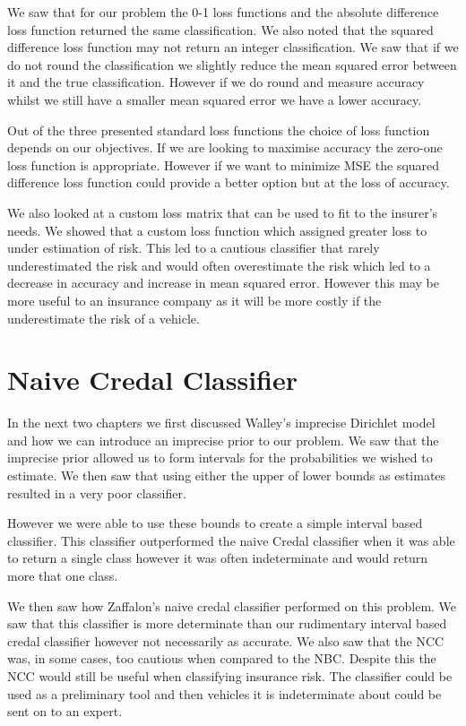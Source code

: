 We saw that for our problem the 0-1 loss functions and the absolute difference loss function returned the same classification.
We also noted that the squared difference loss function may not return an integer classification.
We saw that if we do not round the classification we slightly reduce the mean squared error between it and the true classification.
However if we do round and measure accuracy whilst we still have a smaller mean squared error we have a lower accuracy.

Out of the three presented standard loss functions the choice of loss function depends on our objectives.
If we are looking to maximise accuracy the zero-one loss function is appropriate.
However if we want to minimize MSE the squared difference loss function could provide a better option but at the loss of accuracy.

We also looked at a custom loss matrix that can be used to fit to the insurer's needs.
We showed that a custom loss function which assigned greater loss to under estimation of risk.
This led to a cautious classifier that rarely underestimated the risk and would often overestimate the risk which led to a decrease in accuracy and increase in mean squared error.
However this may be more useful to an insurance company as it will be more costly if the underestimate the risk of a vehicle.

\section{Naive Credal Classifier}

In the next two chapters we first discussed Walley's imprecise Dirichlet model \cite{Walley96} and how we can introduce an imprecise prior to our problem.
We saw that the imprecise prior allowed us to form intervals for the probabilities we wished to estimate.
We then saw that using either the upper of lower bounds as estimates resulted in a very poor classifier.

However we were able to use these bounds to create a simple interval based classifier.
This classifier outperformed the naive Credal classifier when it was able to return a single class however it was often indeterminate and would return more that one class.

We then saw how Zaffalon's naive credal classifier performed on this problem.
We saw that this classifier is more determinate than our rudimentary interval based credal classifier however not necessarily as accurate.
We also saw that the NCC was, in some cases, too cautious when compared to the NBC.
Despite this the NCC would still be useful when classifying insurance risk.
The classifier could be used as a preliminary tool and then vehicles it is indeterminate about could be sent on to an expert.

